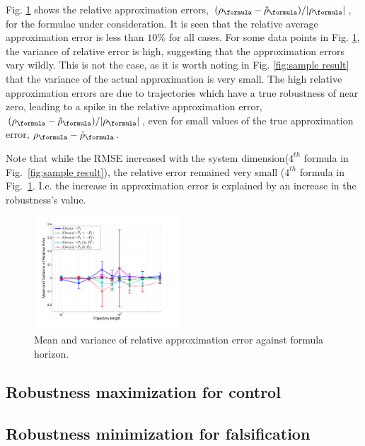 Fig. \ref{fig:relative error} shows the relative approximation errors, $(\robf-\srobf)/|\robf|$, for the formulae under consideration. 
It is seen that the relative average approximation error is less than $10\%$ for all cases. 
For some data points in Fig. \ref{fig:relative error}, the variance of relative error is high, suggesting that the approximation errors vary wildly. This is not the case, as it is worth noting in Fig. \ref{fig:sample result} that the variance of the actual approximation is very small. 
The high relative approximation errors are due to trajectories which have a true robustness of near zero, leading to a spike in the relative approximation error, $(\robf-\srobf)/|\robf|$, even for small values of the true approximation error, $\robf-\srobf$.

Note that while the RMSE  increased with the system dimension($4^{th}$ formula in Fig.~\ref{fig:sample result}), the relative error remained very small ($4^{th}$ formula in Fig.~\ref{fig:relative error}.
I.e. the increase in approximation error is explained by an increase in the robustness's value. 

\begin{figure}[t]
\centering
\includegraphics[width=0.49\textwidth]{figures/RobustnessErrorRel}
\caption{Mean and variance of relative approximation error against formula horizon.}
\label{fig:relative error}
\end{figure}


\subsection{Robustness maximization for control}
\label{sec:toy example}


\subsection{Robustness minimization for falsification}
\label{sec:toy falsification}
